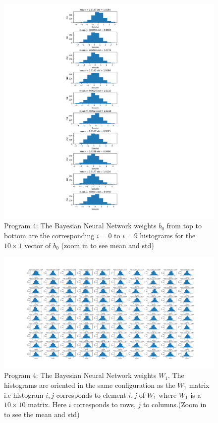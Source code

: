 \documentclass[]{article}
\begin{document}
\begin{figure}[h]
	\begin{center}
		\includegraphics[width=\textwidth]{Graph/b0_nn.png}
		\caption{Program 4: The Bayesian Neural Network weights $b_0$ from top to bottom are the corresponding $i=0$ to $i=9$ histograms for the $10\times1$ vector of $b_0$ (zoom in to see mean and std)}
	\end{center}
\end{figure}
\begin{figure}[h]
	\begin{center}
		\includegraphics[width=\textwidth]{Graph/W1_nn.png}
		\caption{Program 4: The Bayesian Neural Network weights $W_1$. The histograms are oriented in the same configuration as the $W_1$ matrix i.e histogram $i,j$ corresponds to element $i,j$ of $W_1$ where $W_1$ is a $10\times10$ matrix. Here $i$ corresponds to rows, $j$ to columns.(Zoom in to see the mean and std)}
	\end{center}
\end{figure}
\end{document}
